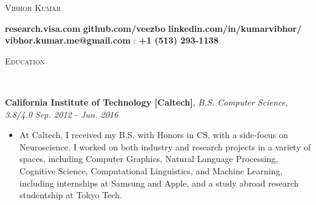 \documentclass[9pt]{article}
\newenvironment{changemargin}[2]{%
  \begin{list}{}{%
    \setlength{\topsep}{0pt}%
    \setlength{\leftmargin}{#1}%
    \setlength{\rightmargin}{#2}%
    \setlength{\listparindent}{\parindent}%
    \setlength{\itemindent}{\parindent}%
    \setlength{\parsep}{\parskip}%
  }%
  \item[]}{\end{list}
}
\newcommand{\lineover}{
	\begin{changemargin}{-0.05in}{-0.05in}
		\vspace*{-8pt}
		\hrulefill \\
		\vspace*{-2pt}
	\end{changemargin}
}
\newcommand{\header}[1]{
	\begin{changemargin}{-0.5in}{-0.5in}
		\scshape{#1}\\
  	\lineover
	\end{changemargin}
}
\newenvironment{body} {
	\vspace*{-16pt}
	\begin{changemargin}{-0.25in}{-0.5in}
  }	
	{\end{changemargin}
}
\begin{document}
\begin{center} 
	{\Large \scshape Vibhor Kumar} 
\end{center}
	\vspace*{-2pt}
\faCcVisa \hspace{0.25mm} \textbf{research.visa.com} \hspace{7.25mm} \faGithub \hspace{0.25mm} \textbf{github.com/veezbo} \hspace{7.25mm} \faLinkedinSquare \hspace{0.25mm} \textbf{linkedin.com/in/kumarvibhor/} \\
\vspace*{3pt}  \hspace{12.25mm} \faEnvelope \hspace{0.1mm} \textbf{vibhor.kumar.me@gmail.com} \hspace{8.25mm} \faMobile : \textbf{+1 (513) 293-1138}\\
\vspace{1pt}
\smallskip
\header{Education}
\begin{body}
	\vspace{16pt}
	\textbf{California Institute of Technology [Caltech]}{}, \emph{B.S. Computer Science, 3.8/4.0} \hfill \emph{Sep. 2012 - Jun. 2016}{} \\
	\vspace{-3pt}
	\begin{itemize} \itemsep -0pt
    \item At Caltech, I received my B.S. with Honors in CS, with a side-focus on Neuroscience. I worked on both industry and research projects in a variety of spaces, including Computer Graphics, Natural Language Processing, Cognitive Science, Computational Linguistics, and Machine Learning, including internships at Samsung and Apple, and a study abroad research studentship at Tokyo Tech.
	\end{itemize}
\end{body}

\smallskip
\vspace*{-3pt}
\end{document}
